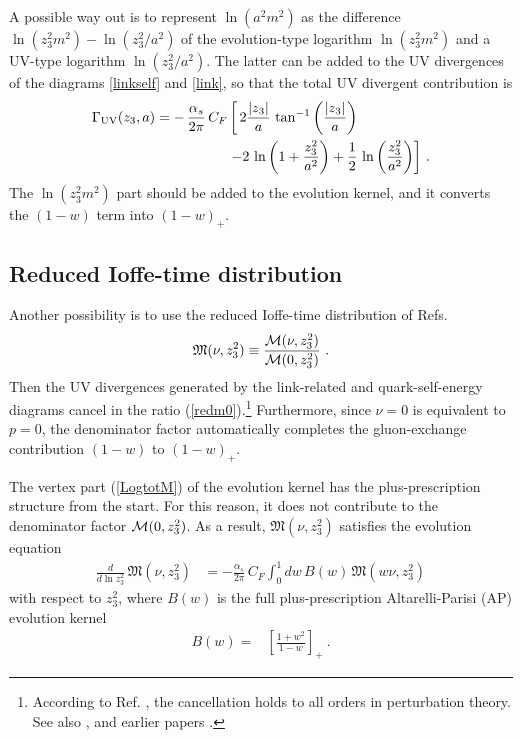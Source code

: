 \documentclass[final,5p,times,twocolumn]{elsarticle}
\newcommand{\nn}{\nonumber \\ }
\begin{document}
A possible way out is to represent  $\ln (a^2 m^2)$   as   the difference $\ln (z_3^2 m^2)   -  \ln (z_3^2 /a^2) $
of the evolution-type logarithm $\ln (z_3^2 m^2)  $ and a UV-type logarithm  $ \ln (z_3^2 /a^2) $.
The latter  can be  added 
to the UV divergences of the diagrams \ref{linkself} and \ref{link},
so that the total UV divergent contribution 
is   
 \begin{align} 
\Gamma_{\rm UV} (z_3, a)   =   - \,\frac{\alpha_s}{2\pi}\, C_F
   & \left [  
   \,
 2  \frac{ |z_3|}{a} \,  \tan
   ^{-1}\left(\frac{|z_3|}{a}\right)   \right. \nn & \left.  - 2  \,  \ln 
   \left(1+ \frac{z_3^2}{a^2}\right) +\frac12 \,  \ln 
   \left( \frac{z_3^2}{a^2}\right) \right ] \,  . 
       \label{GUV}
 \end{align}
The $\ln (z_3^2 m^2)$  part  should be added to the evolution  kernel, and it converts the $(1-w)$ term into 
$(1-w)_+$.  


\subsection{Reduced Ioffe-time distribution}


Another possibility is to use 
the reduced Ioffe-time distribution  of Refs. \cite{Radyushkin:2017cyf,Radyushkin:2017sfi,Orginos:2017kos,Karpie:2017bzm} 
 \begin{align}
{\mathfrak M} (\nu, z_3^2) \equiv \frac{ {\cal M} (\nu, z_3^2)}{{\cal M} (0, z_3^2)} \  . 
 \label{redm0}
\end{align}
Then the  UV divergences generated by the link-related  and quark-self-energy diagrams 
cancel in the ratio (\ref{redm0}).\footnote{According to Ref. \cite{Ishikawa:2017faj}, 
the cancellation holds to all orders in perturbation theory.  See also \cite{Ji:2017oey,Green:2017xeu} ,
and earlier papers   \cite{Dotsenko:1979wb,Brandt:1981kf,Aoyama:1981ev,Craigie:1980qs}.}
 Furthermore,
since $\nu=0$ is equivalent to $p=0$, the denominator factor 
automatically completes 
the gluon-exchange contribution $(1-w)$ to $(1-w)_+$.

The vertex part (\ref{LogtotM}) of the evolution 
 kernel  has  the plus-prescription 
 structure from the start. For this reason, it  does  not contribute to  the denominator factor 
 ${\cal M} (0, z_3^2)$. 
As a result,   ${\mathfrak M} (\nu, z_3^2)  $ satisfies the evolution equation 
    \begin{align}
    \frac{d}{d \ln z_3^2} \,  
{\mathfrak M} (\nu, z_3^2)    &= - \frac{\alpha_s}{2\pi} \, C_F
\int_0^1  dw \,   B ( w ) \,   {\mathfrak  M} (w \nu, z_3^2)  
\label{EE}
 \end{align}
with respect to
$z_3^2$,  where $B(w)$ is the 
 full plus-prescription  Altarelli-Parisi  (AP) evolution kernel \cite{Altarelli:1977zs} 
 \begin{align} 
B(w)  =&
       \left [\frac{1+w^2} {1-w}   \right ]_+
  \ .
     \label{V1}
  \end{align}   
\end{document}
